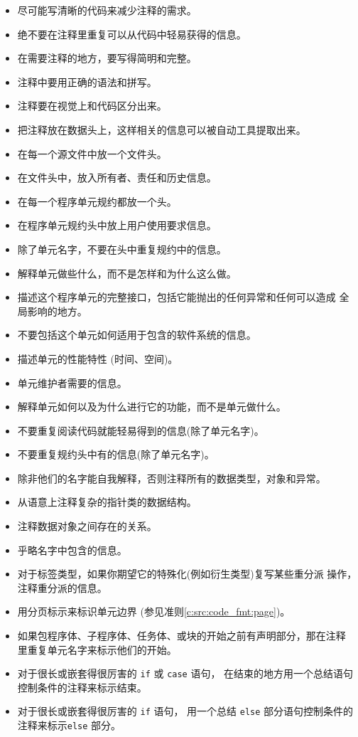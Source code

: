 \noindent
\begin{itemize}
    \item 尽可能写清晰的代码来减少注释的需求。
    \item 绝不要在注释里重复可以从代码中轻易获得的信息。
    \item 在需要注释的地方，要写得简明和完整。
    \item 注释中要用正确的语法和拼写。
    \item 注释要在视觉上和代码区分出来。
    \item 把注释放在数据头上，这样相关的信息可以被自动工具提取出来。

    \item 在每一个源文件中放一个文件头。
    \item 在文件头中，放入所有者、责任和历史信息。

    \item 在每一个程序单元规约都放一个头。
    \item 在程序单元规约头中放上用户使用要求信息。
    \item 除了单元名字，不要在头中重复规约中的信息。
    \item 解释单元做些什么，而不是怎样和为什么这么做。
    \item 描述这个程序单元的完整接口，包括它能抛出的任何异常和任何可以造成
全局影响的地方。
    \item 不要包括这个单元如何适用于包含的软件系统的信息。
    \item 描述单元的性能特性 (时间、空间)。

    \item 单元维护者需要的信息。
    \item 解释单元如何以及为什么进行它的功能，而不是单元做什么。
    \item 不要重复阅读代码就能轻易得到的信息(除了单元名字)。
    \item 不要重复规约头中有的信息(除了单元名字)。

    \item 除非他们的名字能自我解释，否则注释所有的数据类型，对象和异常。
    \item 从语意上注释复杂的指针类的数据结构。
    \item 注释数据对象之间存在的关系。
    \item 乎略名字中包含的信息。
    \item 对于标签类型，如果你期望它的特殊化(例如衍生类型)复写某些重分派
    操作，注释重分派的信息。

    \item 用分页标示来标识单元边界 (参见准则\ref{c:src:code_fmt:page})。
    \item 如果包程序体、子程序体、任务体、或块的开始之前有声明部分，那在注释
    里重复单元名字来标示他们的开始。
    \item 对于很长或嵌套得很厉害的 \texttt{if} 或 \texttt{case} 语句，
    在结束的地方用一个总结语句控制条件的注释来标示结束。
    \item 对于很长或嵌套得很厉害的 \texttt{if} 语句，
    用一个总结 \texttt{else} 部分语句控制条件的注释来标示\texttt{else} 部分。
\end{itemize}

